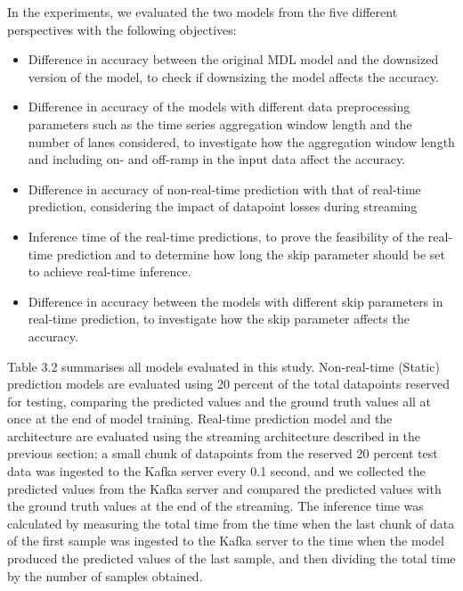 \documentclass[11pt]{uonthesis}
\begin{document}
In the experiments, we evaluated the two models from the five different perspectives with the following objectives:
\begin{itemize}
    \item Difference in accuracy between the original MDL model and the downsized version of the model, to check if downsizing the model affects the accuracy.
    \item Difference in accuracy of the models with different data preprocessing parameters such as the time series aggregation window length and the number of lanes considered, to investigate how the aggregation window length and including on- and off-ramp in the input data affect the accuracy.
    \item Difference in accuracy of non-real-time prediction with that of real-time prediction, considering the impact of datapoint losses during streaming
    \item Inference time of the real-time predictions, to prove the feasibility of the real-time prediction and to determine how long the skip parameter should be set to achieve real-time inference.
    \item Difference in accuracy between the models with different skip parameters in real-time prediction, to investigate how the skip parameter affects the accuracy.
\end{itemize} Table 3.2 summarises all models evaluated in this study. Non-real-time (Static) prediction models are evaluated using 20 percent of the total datapoints reserved for testing, comparing the predicted values and the ground truth values all at once at the end of model training. Real-time prediction model and the architecture are evaluated using the streaming architecture described in the previous section; a small chunk of datapoints from the reserved 20 percent test data was ingested to the Kafka server every 0.1 second, and we collected the predicted values from the Kafka server and compared the predicted values with the ground truth values at the end of the streaming. The inference time was calculated by measuring the total time from the time when the last chunk of data of the first sample was ingested to the Kafka server to the time when the model produced the predicted values of the last sample, and then dividing the total time by the number of samples obtained.
\end{document}
